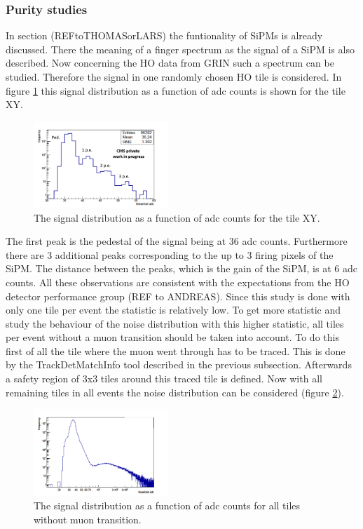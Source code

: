 		\subsubsection{Purity studies}
			In section (REFtoTHOMASorLARS) the funtionality of SiPMs is already discussed.
			There the meaning of a finger spectrum as the signal of a SiPM is also described.
			Now concerning the HO data from GRIN such a spectrum can be studied.
			Therefore the signal in one randomly chosen HO tile is considered.
			In figure \ref{fig:noise_low} this signal distribution as a function of adc counts is shown for the tile XY.
			\begin{figure}[htbp]
				\centering
				\includegraphics[width=0.45\textwidth]{Figures/erdogan/noise_low.png}
				\caption{The signal distribution as a function of adc counts for the tile XY.}
				\label{fig:noise_low}
			\end{figure}
			The first peak is the pedestal of the signal being at 36 adc counts.
			Furthermore there are 3 additional peaks corresponding to the up to 3 firing pixels of the SiPM.
			The distance between the peaks, which is the gain of the SiPM, is at 6 adc counts.
			All these observations are consistent with the expectations from the HO detector performance group (REF to ANDREAS).
			Since this study is done with only one tile per event the statistic is relatively low.
			To get more statistic and study the behaviour of the noise distribution with this higher statistic, all tiles per event without a muon transition should be taken into account.
			To do this first of all the tile where the muon went through has to be traced.
			This is done by the TrackDetMatchInfo tool described in the previous subsection.
			Afterwards a safety region of 3x3 tiles around this traced tile is defined.
			Now with all remaining tiles in all events the noise distribution can be considered (figure \ref{fig:noise_high}).
			\begin{figure}[htbp]
				\centering
				\includegraphics[width=0.45\textwidth]{Figures/erdogan/noise_high.png}
				\caption{The signal distribution as a function of adc counts for all tiles without muon transition.}
				\label{fig:noise_high}
			\end{figure}
